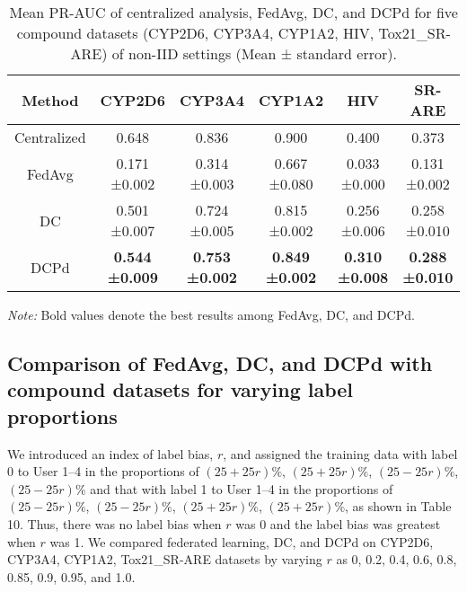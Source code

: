 \documentclass{article}
\begin{document}
\begin{table}[htbp]
\centering
\begin{threeparttable}
\caption{Mean PR-AUC of centralized analysis, FedAvg, DC, and DCPd for five compound datasets (CYP2D6, CYP3A4, CYP1A2, HIV, Tox21\_SR-ARE) of non-IID settings (Mean ± standard error).}
\label{tab:Table 8}
\begin{tabular}{cccccc}
\hline
Method & CYP2D6 & CYP3A4 & CYP1A2 & HIV & SR-ARE \\
\hline
Centralized & 0.648 & 0.836 & 0.900 & 0.400 & 0.373\\
FedAvg & \makecell{0.171 \\ ±0.002} & \makecell{0.314 \\ ±0.003} & \makecell{0.667 \\ ±0.080} & \makecell{0.033 \\ ±0.000} & \makecell{0.131 \\ ±0.002} \\
DC & \makecell{0.501 \\ ±0.007} & \makecell{0.724 \\ ±0.005} & \makecell{0.815 \\ ±0.002} & \makecell{0.256 \\ ±0.006} & \makecell{0.258 \\ ±0.010} \\
DCPd & \makecell{\textbf{0.544} \\ \textbf{±0.009}} & \makecell{\textbf{0.753} \\ \textbf{±0.002}} & \makecell{\textbf{0.849} \\ \textbf{±0.002}} & \makecell{\textbf{0.310} \\ \textbf{±0.008}} & \makecell{\textbf{0.288} \\ \textbf{±0.010}} \\
\hline
\end{tabular}
\begin{tablenotes}
\small
\item \textit{Note:} Bold values denote the best results among FedAvg, DC, and DCPd.
\end{tablenotes}
\end{threeparttable}
\end{table}

\subsection{Comparison of FedAvg, DC, and DCPd with compound datasets for varying label proportions}
\label{sec:sample1}
We introduced an index of label bias, $r$, and assigned the training data with label 0 to User 1--4 in the proportions of $(25+25r)\%$, $(25+25r)\%$, $(25-25r)\%$, $(25-25r)\%$ and that with label 1 to User 1--4 in the proportions of $(25-25r)\%$, $(25-25r)\%$, $(25+25r)\%$,  $(25+25r)\%$, as shown in Table 10. Thus, there was no label bias when $r$ was 0 and the label bias was greatest when $r$ was 1. We compared federated learning, DC, and DCPd on CYP2D6, CYP3A4, CYP1A2, Tox21\_SR-ARE datasets by varying $r$ as 0, 0.2, 0.4, 0.6, 0.8, 0.85, 0.9, 0.95, and 1.0.
\end{document}
